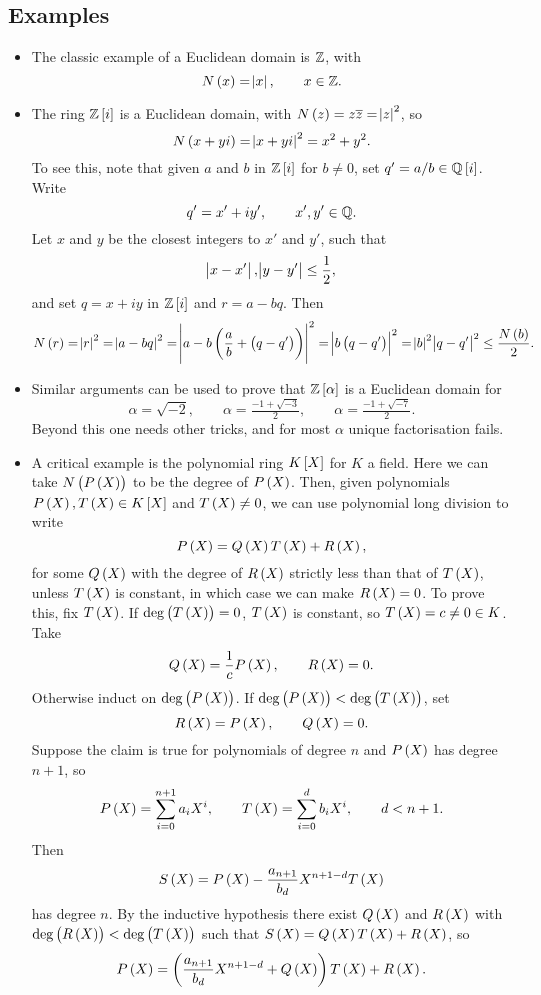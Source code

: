 \pagebreak

\subsection{Examples}

\begin{example*}
\hfill
\begin{itemize}
\item The classic example of a Euclidean domain is $ \mathbb{Z} $, with
$$ N\br{x} = \abs{x}, \qquad x \in \Z. $$
\item The ring $ \Z\sbr{i} $ is a Euclidean domain, with $ N\br{z} = z\overline{z} = \abs{z}^2 $, so
$$ N\br{x + yi} = \abs{x + yi}^2 = x^2 + y^2. $$
To see this, note that given $ a $ and $ b $ in $ \Z\sbr{i} $ for $ b \ne 0 $, set $ q' = a / b \in \Q\sbr{i} $. Write
$$ q' = x' + iy', \qquad x', y' \in \mathbb{Q}. $$
Let $ x $ and $ y $ be the closest integers to $ x' $ and $ y' $, such that
$$ \abs{x - x'}, \abs{y - y'} \le \dfrac{1}{2}, $$
and set $ q = x + iy $ in $ \Z\sbr{i} $ and $ r = a - bq $. Then
$$ N\br{r} = \abs{r}^2 = \abs{a - bq}^2 = \abs{a - b\br{\dfrac{a}{b} + \br{q - q'}}}^2 = \abs{b\br{q - q'}}^2 = \abs{b}^2\abs{q - q'}^2 \le \dfrac{N\br{b}}{2}. $$
\item Similar arguments can be used to prove that $ \Z\sbr{\alpha} $ is a Euclidean domain for
$$ \alpha = \sqrt{-2}, \qquad \alpha = \tfrac{-1 + \sqrt{-3}}{2}, \qquad \alpha = \tfrac{-1 + \sqrt{-7}}{2}. $$
Beyond this one needs other tricks, and for most $ \alpha $ unique factorisation fails.
\item A critical example is the polynomial ring $ K\sbr{X} $ for $ K $ a field. Here we can take $ N\br{P\br{X}} $ to be the degree of $ P\br{X} $. Then, given polynomials $ P\br{X}, T\br{X} \in K\sbr{X} $ and $ T\br{X} \ne 0 $, we can use polynomial long division to write
$$ P\br{X} = Q\br{X}T\br{X} + R\br{X}, $$
for some $ Q\br{X} $ with the degree of $ R\br{X} $ strictly less than that of $ T\br{X} $, unless $ T\br{X} $ is constant, in which case we can make $ R\br{X} = 0 $. To prove this, fix $ T\br{X} $. If $ \deg\br{T\br{X}} = 0 $, $ T\br{X} $ is constant, so $ T\br{X} = c \ne 0 \in K $. Take
$$ Q\br{X} = \dfrac{1}{c}P\br{X}, \qquad R\br{X} = 0. $$
Otherwise induct on $ \deg\br{P\br{X}} $. If $ \deg\br{P\br{X}} < \deg\br{T\br{X}} $, set
$$ R\br{X} = P\br{X}, \qquad Q\br{X} = 0. $$
Suppose the claim is true for polynomials of degree $ n $ and $ P\br{X} $ has degree $ n + 1 $, so
$$ P\br{X} = \sum_{i = 0}^{n + 1} a_iX^i, \qquad T\br{X} = \sum_{i = 0}^d b_iX^i, \qquad d < n + 1. $$
Then
$$ S\br{X} = P\br{X} - \dfrac{a_{n + 1}}{b_d}X^{n + 1 - d}T\br{X} $$
has degree $ n $. By the inductive hypothesis there exist $ Q\br{X} $ and $ R\br{X} $ with $ \deg\br{R\br{X}} < \deg\br{T\br{X}} $ such that $ S\br{X} = Q\br{X}T\br{X} + R\br{X} $, so
$$ P\br{X} = \br{\dfrac{a_{n + 1}}{b_d}X^{n + 1 - d} + Q\br{X}}T\br{X} + R\br{X}. $$
\end{itemize}
\end{example*}

